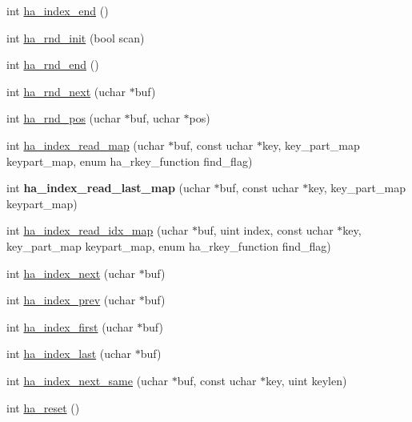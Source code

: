 \begin{DoxyCompactItemize}
\item 
int \mbox{\hyperlink{classhandler_afa6bd01057c6cdd86d2ea2ee4ea65ca3}{ha\+\_\+index\+\_\+end}} ()
\item 
int \mbox{\hyperlink{classhandler_afb5c99736cb400350e007578889b8375}{ha\+\_\+rnd\+\_\+init}} (bool scan)
\item 
int \mbox{\hyperlink{classhandler_ad4d9bf34ac0a004d8c5c32267f20842f}{ha\+\_\+rnd\+\_\+end}} ()
\item 
int \mbox{\hyperlink{classhandler_ad3743f3a48e7be751dbb2691be4c992a}{ha\+\_\+rnd\+\_\+next}} (uchar $\ast$buf)
\item 
int \mbox{\hyperlink{classhandler_abcd8615219b3e692e7d484d2ba6cfa86}{ha\+\_\+rnd\+\_\+pos}} (uchar $\ast$buf, uchar $\ast$pos)
\item 
int \mbox{\hyperlink{classhandler_a729d9c9c011527b81287574294887bf3}{ha\+\_\+index\+\_\+read\+\_\+map}} (uchar $\ast$buf, const uchar $\ast$key, key\+\_\+part\+\_\+map keypart\+\_\+map, enum ha\+\_\+rkey\+\_\+function find\+\_\+flag)
\item 
\mbox{\label{classhandler_a3fa9be09b8d0b1c03c96eb95f79dd7c9}} 
int {\bfseries ha\+\_\+index\+\_\+read\+\_\+last\+\_\+map} (uchar $\ast$buf, const uchar $\ast$key, key\+\_\+part\+\_\+map keypart\+\_\+map)
\item 
int \mbox{\hyperlink{classhandler_ac831321e8d33958db4fd4968de932acf}{ha\+\_\+index\+\_\+read\+\_\+idx\+\_\+map}} (uchar $\ast$buf, uint index, const uchar $\ast$key, key\+\_\+part\+\_\+map keypart\+\_\+map, enum ha\+\_\+rkey\+\_\+function find\+\_\+flag)
\item 
int \mbox{\hyperlink{classhandler_a4c99e96a8350ff577a94529be9387a30}{ha\+\_\+index\+\_\+next}} (uchar $\ast$buf)
\item 
int \mbox{\hyperlink{classhandler_abb977dac0435158be227e45e04c8b798}{ha\+\_\+index\+\_\+prev}} (uchar $\ast$buf)
\item 
int \mbox{\hyperlink{classhandler_abd574a3025588e9b0cd49e0d6908e3b8}{ha\+\_\+index\+\_\+first}} (uchar $\ast$buf)
\item 
int \mbox{\hyperlink{classhandler_a2a7415f1744039a51ef15e923ef7da1b}{ha\+\_\+index\+\_\+last}} (uchar $\ast$buf)
\item 
int \mbox{\hyperlink{classhandler_a3f79360a45d50c6b558feb1c308c4157}{ha\+\_\+index\+\_\+next\+\_\+same}} (uchar $\ast$buf, const uchar $\ast$key, uint keylen)
\item 
int \mbox{\hyperlink{classhandler_a53d38f167906d8aaa9e560c71e595a42}{ha\+\_\+reset}} ()

\end{DoxyCompactItemize}
